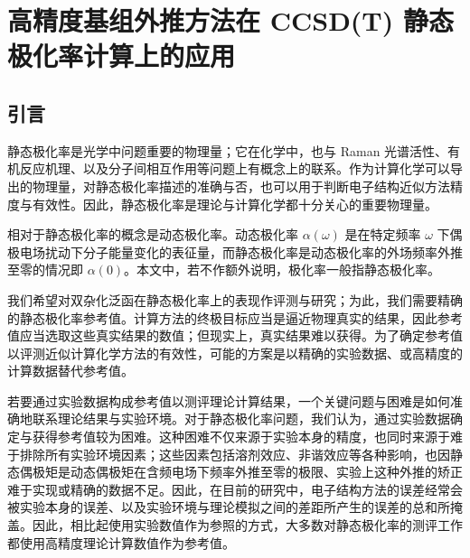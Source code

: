 
\section{高精度基组外推方法在 CCSD(T) 静态极化率计算上的应用}

\subsection{引言}

静态极化率是光学中问题重要的物理量\cite{Marder-Stucky.ACS.1991}；它在化学中，也与 Raman 光谱活性\cite{Wilson-Cross.Dover.1955}、有机反应机理\cite{Xing-Pei.HEP.2005}、以及分子间相互作用\cite{Cohen-Tannoudji-Laloe.Wiley.2020}等问题上有概念上的联系。作为计算化学可以导出的物理量，对静态极化率描述的准确与否，也可以用于判断电子结构近似方法精度与有效性。因此，静态极化率是理论与计算化学都十分关心的重要物理量。

相对于静态极化率的概念是动态极化率。动态极化率 $\alpha(\omega)$ 是在特定频率 $\omega$ 下偶极电场扰动下分子能量变化的表征量，而静态极化率是动态极化率的外场频率外推至零的情况即 $\alpha(0)$。本文中，若不作额外说明，极化率一般指静态极化率。

我们希望对双杂化泛函在静态极化率上的表现作评测与研究；为此，我们需要精确的静态极化率参考值。计算方法的终极目标应当是逼近物理真实的结果，因此参考值应当选取这些真实结果的数值；但现实上，真实结果难以获得。为了确定参考值以评测近似计算化学方法的有效性，可能的方案是以精确的实验数据、或高精度的计算数据替代参考值。

若要通过实验数据构成参考值以测评理论计算结果，一个关键问题与困难是如何准确地联系理论结果与实验环境\cite{Mata-Suhm.ACIE.2017}。对于静态极化率问题，我们认为，通过实验数据确定与获得参考值较为困难。这种困难不仅来源于实验本身的精度，也同时来源于难于排除所有实验环境因素；这些因素包括溶剂效应、非谐效应等各种影响，也因静态偶极矩是动态偶极矩在含频电场下频率外推至零的极限、实验上这种外推的矫正难于实现或精确的数据不足。因此，在目前的研究中，电子结构方法的误差经常会被实验本身的误差、以及实验环境与理论模拟之间的差距所产生的误差的总和所掩盖\cite{Hickey-Rowley.JPCA.2014}。因此，相比起使用实验数值作为参照的方式\cite{Hickey-Rowley.JPCA.2014}，大多数对静态极化率的测评工作都使用高精度理论计算数值作为参考值\cite{Hammond-Xantheas.JCP.2009, Huzak-Deleuze.JCP.2013, Wu-Thakkar.CPL.2015, Kozlowska-Bartkowiak.PCCP.2019, Hait-Head-Gordon.PCCP.2018, Beizaei-Sauer.JPCA.2021}。

